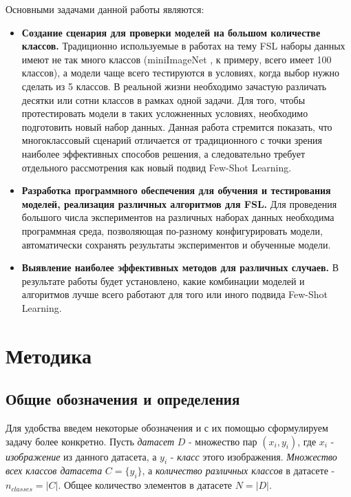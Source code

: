 \documentclass[a4paper, 12pt]{report}
\begin{document}
Основными задачами данной работы являются:
\begin{itemize}

\item \textbf {Создание сценария для проверки моделей на большом количестве классов.} Традиционно используемые в работах на тему FSL наборы данных имеют не так много классов (miniImageNet \cite{imagenet}, к примеру, всего имеет 100 классов), а модели чаще всего тестируются в условиях, когда выбор нужно сделать из 5 классов. В реальной жизни необходимо зачастую различать десятки или сотни классов в рамках одной задачи. Для того, чтобы протестировать модели в таких усложненных условиях, необходимо подготовить новый набор данных. Данная работа стремится показать, что многоклассовый сценарий отличается от традиционного с точки зрения наиболее эффективных способов решения, а следовательно требует отдельного рассмотрения как новый подвид Few-Shot Learning.

\item \textbf {Разработка программного обеспечения для обучения и тестирования моделей, реализация различных алгоритмов для FSL.} Для проведения большого числа экспериментов на различных наборах данных необходима  программная среда, позволяющая по-разному конфигурировать модели, автоматически сохранять результаты экспериментов и обученные модели.

\item \textbf {Выявление наиболее эффективных методов для различных случаев.} В результате работы будет установлено, какие комбинации моделей и алгоритмов лучше всего работают для того или иного подвида Few-Shot Learning.

\end{itemize}

\chapter{Методика}

\section {Общие обозначения и определения}

Для удобства введем некоторые обозначения и с их помощью сформулируем задачу более конкретно. Пусть \textit{датасет} $D$ - множество пар $(x_i, y_i)$, где $x_i$ - \textit{изображение} из данного датасета, а $y_i$ - \textit{класс} этого изображения. \textit{Множество всех классов датасета} $C = \{y_i\}$, а \textit{количество различных классов} в датасете - $n_{classes} = |C|$. Общее количество элементов в датасете $N = |D|$. \\
\end{document}
